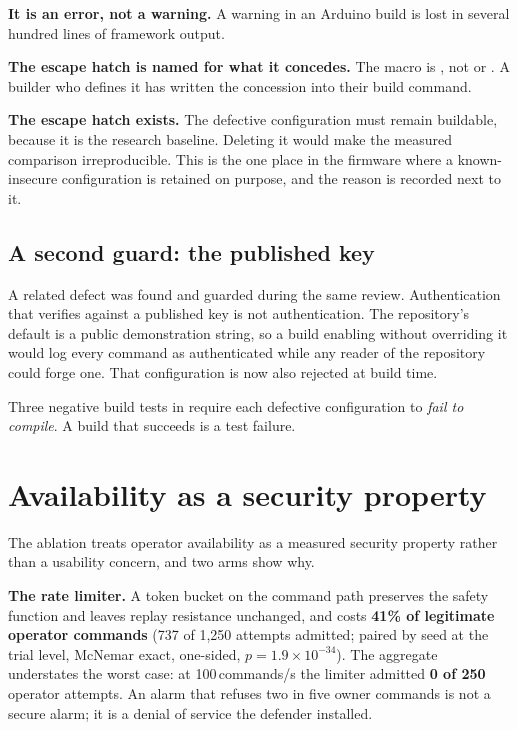 \textbf{It is an error, not a warning.} A warning in an Arduino build is lost in several hundred
lines of framework output.

\textbf{The escape hatch is named for what it concedes.} The macro is
, not  or . A builder who
defines it has written the concession into their build command.

\textbf{The escape hatch exists.} The defective configuration must remain buildable, because it
is the research baseline. Deleting it would make the measured comparison irreproducible. This is
the one place in the firmware where a known-insecure configuration is retained on purpose, and
the reason is recorded next to it.

\subsection{A second guard: the published key}

A related defect was found and guarded during the same review. Authentication that verifies
against a published key is not authentication. The repository's  default
is a public demonstration string, so a build enabling  without overriding it
would log every command as authenticated while any reader of the repository could forge one. That
configuration is now also rejected at build time.

Three negative build tests in  require each defective
configuration to \emph{fail to compile}. A build that succeeds is a test failure.

\section{Availability as a security property}

The ablation treats operator availability as a measured security property rather than a
usability concern, and two arms show why.

\textbf{The rate limiter.} A token bucket on the command path preserves the safety function and
leaves replay resistance unchanged, and costs \textbf{41\% of legitimate operator commands}
(737 of 1,250 attempts admitted; paired by seed at the trial level, McNemar exact, one-sided,
$p = 1.9 \times 10^{-34}$). The aggregate understates the worst case: at 100\,commands/s the
limiter admitted \textbf{0 of 250} operator attempts. An alarm that refuses two in
five owner commands is not a secure alarm; it is a denial of service the defender installed.

